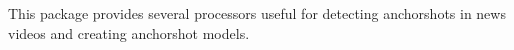 
This package provides several processors useful for detecting anchorshots in news videos and creating anchorshot models.